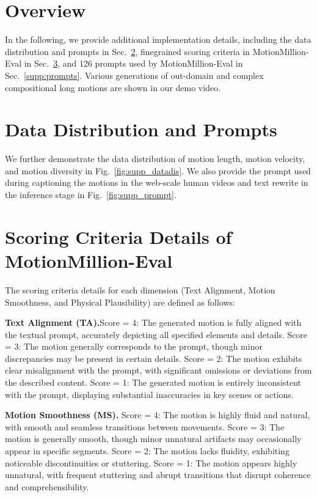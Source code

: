 \clearpage
\setcounter{page}{1}
\maketitlesupplementary



\section{Overview}
In the following, we provide additional implementation details, including the data distribution and prompts in Sec.~\ref{supp:ddp}, finegrained scoring criteria in MotionMillion-Eval in Sec.~\ref{supp:eval_detail}, and 126 prompts used by MotionMillion-Eval in Sec.~\ref{supp:prompts}.
Various generations of out-domain and complex compositional long motions are shown in our demo video.

\section{Data Distribution and Prompts}
\label{supp:ddp}
We further demonstrate the data distribution of motion length, motion velocity, and motion diversity in Fig.~\ref{fig:supp_datadis}. We also provide the prompt used during captioning the motions in the web-scale human videos and text rewrite in the inference stage in Fig.~\ref{fig:supp_prompt}.

\section{Scoring Criteria Details of MotionMillion-Eval}
\label{supp:eval_detail}
The scoring criteria details for each dimension (Text Alignment, Motion Smoothness, and  Physical Plausibility) are defined as follows:

\textbf{Text Alignment (TA).}Score = 4: The generated motion is fully aligned with the textual prompt, accurately depicting all specified elements and details.
Score = 3: The motion generally corresponds to the prompt, though minor discrepancies may be present in certain details.
Score = 2: The motion exhibits clear misalignment with the prompt, with significant omissions or deviations from the described content.
Score = 1: The generated motion is entirely inconsistent with the prompt, displaying substantial inaccuracies in key scenes or actions.

\textbf{Motion Smoothness (MS).} Score = 4: The motion is highly fluid and natural, with smooth and seamless transitions between movements. Score = 3: The motion is generally smooth, though minor unnatural artifacts may occasionally appear in specific segments. Score = 2: The motion lacks fluidity, exhibiting noticeable discontinuities or stuttering. Score = 1: The motion appears highly unnatural, with frequent stuttering and abrupt transitions that disrupt coherence and comprehensibility.

